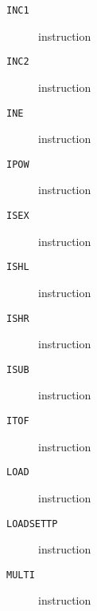 \clearpage
\begin{description}
\item[\texttt{INC1}] instruction\\

\end{description}
\clearpage
\begin{description}
\item[\texttt{INC2}] instruction\\

\end{description}
\clearpage
\begin{description}
\item[\texttt{INE}] instruction\\

\end{description}
\clearpage
\begin{description}
\item[\texttt{IPOW}] instruction\\

\end{description}
\clearpage
\begin{description}
\item[\texttt{ISEX}] instruction\\

\end{description}
\clearpage
\begin{description}
\item[\texttt{ISHL}] instruction\\

\end{description}
\clearpage
\begin{description}
\item[\texttt{ISHR}] instruction\\

\end{description}
\clearpage
\begin{description}
\item[\texttt{ISUB}] instruction\\

\end{description}
\clearpage
\begin{description}
\item[\texttt{ITOF}] instruction\\

\end{description}
\clearpage
\begin{description}
\item[\texttt{LOAD}] instruction\\

\end{description}
\clearpage
\begin{description}
\item[\texttt{LOADSETTP}] instruction\\

\end{description}
\clearpage
\begin{description}
\item[\texttt{MULTI}] instruction\\

\end{description}
\clearpage
